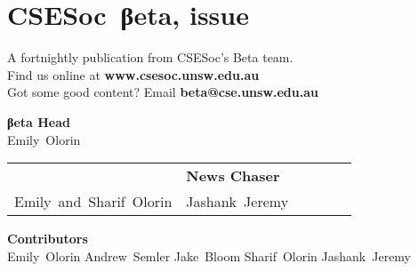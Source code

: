 \documentclass[twoside]{article}
\date{11 April 2016}
\makeatletter
\gdef\the@issue{117}
\makeatother
\begin{document}

\newpage
\maketitle\thispagestyle{mag}
\vspace*{-2em}\section*{CSE{}Soc~βeta, issue \makeatletter\the@issue}
\begin{multicols}{2}\begingroup\raggedcolumns
\begin{center}
A fortnightly publication from CSESoc's Beta team.\\
Find us online at \textbf{www.csesoc.unsw.edu.au}\\
Got some good content? Email \textbf{beta@cse.unsw.edu.au}\\
\par{\bf\sffamily βeta Head}\\ Emily~Olorin
\par\begin{tabular}{>{\raggedleft}p{0.5\linewidth}>{\raggedright}p{0.5\linewidth}}
{\bf\sffamily Puzzle Wrangler} & {\bf\sffamily News Chaser}\tabularnewline
Emily~and~Sharif~Olorin & Jashank~Jeremy\tabularnewline
\end{tabular}
\par{\bf\sffamily Contributors}\\
  Emily~Olorin\hsp{}
  Andrew~Semler\hsp{}
  Jake~Bloom\hsp{}
  Sharif~Olorin\hsp{}
  Jashank~Jeremy\hsp{}
\end{center}
\columnbreak\malcontents\vfill\endgroup
\end{multicols}\LRmulticolcolumns
\vspace*{-4em}\begin{multicols}{2}


\end{multicols}
\end{document}

